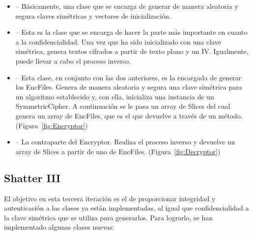 \begin{itemize}
  \item {} -- Básicamente, una clase que se encarga de
  generar de manera aleatoria y segura claves simétricas y vectores de
  inicialización.

  \item {} -- Esta es la clase que se encarga de hacer
  la parte más importante en cuanto a la confidencialidad. Una vez que ha sido
  inicializado con una clave simétrica, genera textos cifrados a partir de
  texto plano y un IV. Igualmente, puede llevar a cabo el proceso inverso.

  \item {} -- Esta clase, en conjunto con las dos anteriores,
  es la encargada de generar los EncFiles. Genera de manera aleatoria y segura
  una clave simétrica para un algoritmo establecido y, con ella, inicializa una
  instancia de un SymmetricCipher. A continuación se le pasa un array de Slices
  del cual genera un array de EncFiles, que es el que devuelve a través de un
  método. (Figura~\ref{fig:Encryptor})

  \item {} -- La contraparte del Encryptor. Realiza el proceso
  inverso y devuelve un array de Slices a partir de uno de EncFiles.
  (Figura~\ref{fig:Decryptor})
\end{itemize}


\subsection{Shatter III}

El objetivo en esta tercera iteración es el de proporcionar integridad y
autenticación a las clases ya están implementadas, al igual que confidencialidad
a la clave simétrica que se utiliza para generarlos. Para lograrlo, se han
implementado algunas clases nuevas:

